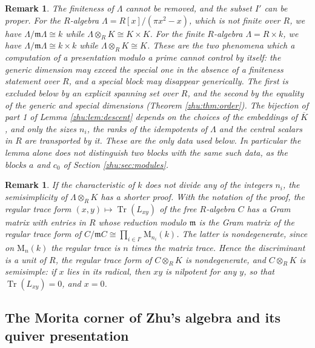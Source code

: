 \documentclass[leqno]{article}
\newcommand{\M}{\mathrm{M}}
\newcommand{\ot}{\otimes}
\newcommand{\ovl}{\overline}
\DeclareMathOperator{\Tr}{Tr}
\newtheorem{remark}[thm]{Remark}
\numberwithin{equation}{section}
\begin{document}
\begin{remark} \normalfont
\label{zhu:rem:descent-counterexamples}
The finiteness of $\Lambda$ cannot be removed, and the subset $I'$ can be proper. For the $R$-algebra $\Lambda = R[x]/(\pi x^2 - x)$, which is not finite over $R$, we have $\Lambda/\mathfrak m\Lambda \cong k$ while $\Lambda \ot_R K \cong K \times K$. For the finite $R$-algebra $\Lambda = R \times k$, we have $\Lambda/\mathfrak m\Lambda \cong k \times k$ while $\Lambda \ot_R K \cong K$. These are the two phenomena which a computation of a presentation modulo a prime cannot control by itself: the generic dimension may exceed the special one in the absence of a finiteness statement over $R$, and a special block may disappear generically. The first is excluded below by an explicit spanning set over $R$, and the second by the equality of the generic and special dimensions (Theorem \ref{zhu:thm:order}). The bijection of part 1 of Lemma \ref{zhu:lem:descent} depends on the choices of the embeddings of $\ovl K$, and only the sizes $n_i$, the ranks of the idempotents of $\Lambda$ and the central scalars in $R$ are transported by it. These are the only data used below. In particular the lemma alone does not distinguish two blocks with the same such data, as the blocks $a$ and $c_0$ of Section \ref{zhu:sec:modules}.
\end{remark}

\begin{remark} \normalfont
\label{zhu:rem:trace-form}
If the characteristic of $k$ does not divide any of the integers $n_i$, the semisimplicity of $\Lambda \ot_R K$ has a shorter proof. With the notation of the proof, the regular trace form $(x,y) \mapsto \Tr(L_{xy})$ of the free $R$-algebra $C$ has a Gram matrix with entries in $R$ whose reduction modulo $\mathfrak m$ is the Gram matrix of the regular trace form of $C/\mathfrak m C \cong \prod_{i \in I'} \M_{n_i}(k)$. The latter is nondegenerate, since on $\M_n(k)$ the regular trace is $n$ times the matrix trace. Hence the discriminant is a unit of $R$, the regular trace form of $C \ot_R K$ is nondegenerate, and $C \ot_R K$ is semisimple: if $x$ lies in its radical, then $xy$ is nilpotent for any $y$, so that $\Tr(L_{xy}) = 0$, and $x = 0$.
\end{remark}
\subsection{The Morita corner of Zhu's algebra and its quiver presentation}
\label{zhu:sec:corner}
\end{document}
